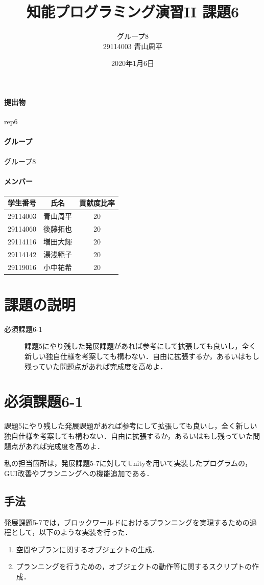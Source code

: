 \documentclass[12pt]{jarticle}
\title{知能プログラミング演習II 課題6}
\author{グループ8\\
  29114003 青山周平\\
}
\date{2020年1月6日}
\begin{document}
\maketitle

\paragraph{提出物} rep6
\paragraph{グループ} グループ8
\paragraph{メンバー}
\begin{tabular}{|c|c|c|}
  \hline
  学生番号&氏名&貢献度比率\\
  \hline\hline
  29114003&青山周平&20\\
  \hline
  29114060&後藤拓也&20\\
  \hline
  29114116&増田大輝&20\\
  \hline
  29114142&湯浅範子&20\\
  \hline
  29119016&小中祐希&20\\
  \hline
\end{tabular}

\section{課題の説明}
\begin{description}
\item[必須課題6-1] 課題5にやり残した発展課題があれば参考にして拡張しても良いし，全く新しい独自仕様を考案しても構わない．自由に拡張するか，あるいはもし残っていた問題点があれば完成度を高めよ．
\end{description}

\section{必須課題6-1}
\begin{screen}
課題5にやり残した発展課題があれば参考にして拡張しても良いし，全く新しい独自仕様を考案しても構わない．自由に拡張するか，あるいはもし残っていた問題点があれば完成度を高めよ．
\end{screen}
私の担当箇所は，発展課題5-7に対してUnityを用いて実装したプログラムの，GUI改善やプランニングへの機能追加である．

\subsection{手法}
発展課題5-7では，ブロックワールドにおけるプランニングを実現するための過程として，以下のような実装を行った．
\begin{enumerate}
\item 空間やプランに関するオブジェクトの生成．
\item プランニングを行うための，オブジェクトの動作等に関するスクリプトの作成．
\end{enumerate}
\end{document}
